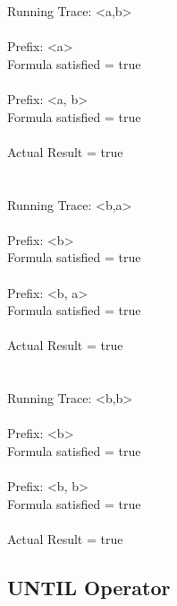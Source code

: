 \newpage

\noindent Running Trace: \textless a,b\textgreater\\
\\
  Prefix: \textless a\textgreater\\
  Formula satisfied = true\\
\\
  Prefix: \textless a, b\textgreater\\
  Formula satisfied = true\\
\\
  Actual Result = true\\
\\
\\
Running Trace: \textless b,a\textgreater\\
\\
  Prefix: \textless b\textgreater\\
  Formula satisfied = true\\
\\
  Prefix: \textless b, a\textgreater\\
  Formula satisfied = true\\
\\
  Actual Result = true\\
\\
\\
Running Trace: \textless b,b\textgreater\\
\\
  Prefix: \textless b\textgreater\\
  Formula satisfied = true\\
\\
  Prefix: \textless b, b\textgreater\\
  Formula satisfied = true\\
\\
  Actual Result = true\\

\subsection{UNTIL Operator}

